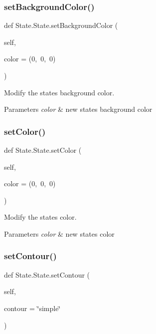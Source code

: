 \subsubsection{\texorpdfstring{setBackgroundColor()}{setBackgroundColor()}}
{\footnotesize\ttfamily def State.\+State.\+set\+Background\+Color (\begin{DoxyParamCaption}\item[{}]{self,  }\item[{}]{color = {\ttfamily (0,~0,~0)} }\end{DoxyParamCaption})}



Modify the state\textquotesingle{}s background color. 


\begin{DoxyParams}{Parameters}
{\em color} & new state\textquotesingle{}s background color \\
\hline
\end{DoxyParams}
\mbox{\label{classState_1_1State_a9ae69a0a04376e2210c2ae2bcceb9e9f}} 
\subsubsection{\texorpdfstring{setColor()}{setColor()}}
{\footnotesize\ttfamily def State.\+State.\+set\+Color (\begin{DoxyParamCaption}\item[{}]{self,  }\item[{}]{color = {\ttfamily (0,~0,~0)} }\end{DoxyParamCaption})}



Modify the state\textquotesingle{}s color. 


\begin{DoxyParams}{Parameters}
{\em color} & new state\textquotesingle{}s color \\
\hline
\end{DoxyParams}
\mbox{\label{classState_1_1State_a1957da99a57d165cd3275ffc38082293}} 
\subsubsection{\texorpdfstring{setContour()}{setContour()}}
{\footnotesize\ttfamily def State.\+State.\+set\+Contour (\begin{DoxyParamCaption}\item[{}]{self,  }\item[{}]{contour = {\ttfamily \char`\"{}simple\char`\"{}} }\end{DoxyParamCaption})}



